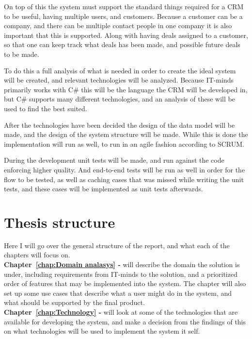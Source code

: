 On top of this the system must support the standard things required for a CRM to be useful,
having multiple users, and customers. Because a customer can be a company, and
there can be multiple contact people in one company it is also important that this
is supported. Along with having deals assigned to a customer, so that one can keep track
what deals has been made, and possible future deals to be made.

To do this a full analysis of what is needed in order to create the ideal system
will be created, and relevant technologies will be analyzed. Because IT-minds primarily
works with C\# this will be the language the CRM will be developed in, but C\# supports
many different technologies, and an analysis of these will be used to find the best suited.

After the technologies have been decided the design of the data model will be made, and the design of the system structure will be made. While this is done the implementation will run as well, to run in an agile fashion according to SCRUM.

During the development unit tests will be made, and run against the code enforcing higher quality.
And end-to-end tests will be run as well in order for the flow to be tested, as well as caching cases that was missed while writing the unit tests, and these cases will be implemented as unit tests afterwards.

\section{Thesis structure}
\label{sec:Thesis structure}
Here I will go over the general structure of the report, and what each of the chapters will focus on.\\

\textbf{Chapter~\ref{chap:Domain analasys} - } will describe the domain the solution is under, including requirements from IT-minds to the solution, and a prioritized order of features that may be implemented into the system. The chapter will also set up some use cases that describe what a user might do in the system, and what should be supported by the final product.\\

\textbf{Chapter~\ref{chap:Technology} - } will look at some of the technologies that are available for developing the system, and make a decision from the findings of this on what technologies will be used to implement the system it self.\\

